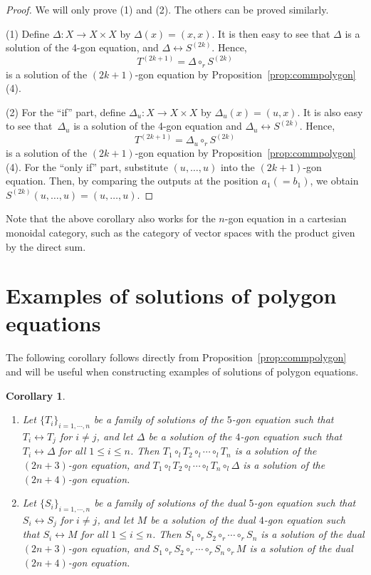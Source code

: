 \documentclass[10pt,a4paper]{amsart}
\numberwithin{equation}{section}
\newtheorem{Corollary}[Theorem]{Corollary}
\theoremstyle{definition}
\begin{document}
\begin{proof}
 We will only prove (1) and (2). The others can be proved similarly.

 (1) Define $\Delta\colon X\to X\times X$ by $\Delta(x) = (x, x)$. It is then easy to see that $\Delta$ is a solution of the 4-gon equation, and $\Delta \leftrightarrow S^{(2k)}$. Hence, \[
 T^{(2k+1)}=\Delta \circ_r S^{(2k)}
 \] is a solution of the $(2k+1)$-gon equation by Proposition~\ref{prop:commpolygon}\,(4).

 (2) For the ``if'' part, define $\Delta_u\colon X\to X\times X$ by $\Delta_u(x) = (u, x)$. It is also easy to see that~$\Delta_u$ is a solution of the 4-gon equation and $\Delta_u \leftrightarrow S^{(2k)}$. Hence, \[
 T^{(2k+1)}=\Delta_u \circ_r S^{(2k)}
 \] is a solution of the $(2k+1)$-gon equation by Proposition~\ref{prop:commpolygon}\,(4). For the ``only if'' part, substitute $(u,\dots,u)$ into the $(2k+1)$-gon equation. Then, by comparing the outputs at the position $a_1(=b_1)$, we obtain $S^{(2k)}(u,\dots, u)=(u,\dots,u)$.
\end{proof}

Note that the above corollary also works for the $n$-gon equation in a cartesian monoidal category, such as the category of vector spaces with the product given by the direct sum.

\section{Examples of solutions of polygon equations}\label{sec:examples_polygon_eq}

The following corollary follows directly from Proposition~\ref{prop:commpolygon} and will be useful when constructing examples of solutions of polygon equations.

\begin{Corollary}\label{cor:comm}\quad
 \begin{enumerate}\itemsep=0pt
 \item[$(1)$] Let $\{ T_i \}_{i=1,\cdots,n}$ be a family of solutions of the $5$-gon equation such that $T_i\leftrightarrow T_j$ for $i\neq j$, and let $\Delta$ be a solution of the $4$-gon equation such that $T_i\leftrightarrow\Delta$ for all $1\leq i \leq n$. Then $T_1 \circ_l T_2 \circ_l \cdots \circ_l T_n$ is a solution of the $(2n+3)$-gon equation, and $T_1 \circ_l T_2 \circ_l \cdots \circ_l T_n \circ_l \Delta$ is a solution of the $(2n+4)$-gon equation.
 \item[$(2)$] Let $\{ S_i \}_{i=1,\cdots,n}$ be a family of solutions of the dual $5$-gon equation such that $S_i\leftrightarrow S_j$ for $i\neq j$, and let $M$ be a solution of the dual $4$-gon equation such that $S_i\leftrightarrow M$ for all $1\leq i \leq n$. Then $S_1 \circ_r S_2 \circ_r \cdots \circ_r S_n$ is a solution of the dual $(2n+3)$-gon equation, and $S_1 \circ_r S_2 \circ_r \cdots \circ_r S_n \circ_r M$ is a solution of the dual $(2n+4)$-gon equation.
 \end{enumerate}
\end{Corollary}
\end{document}
